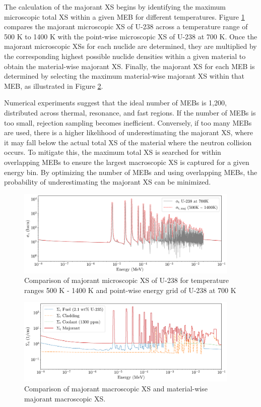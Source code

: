 The calculation of the majorant XS begins by identifying the maximum microscopic total XS within a given MEB for different temperatures. Figure \ref{fig_2} compares the majorant microscopic XS of U-238 across a temperature range of 500 K to 1400 K with the point-wise microscopic XS of U-238 at 700 K. Once the majorant microscopic XSs for each nuclide are determined, they are multiplied by the corresponding highest possible nuclide densities within a given material to obtain the material-wise majorant XS. Finally, the majorant XS for each MEB is determined by selecting the maximum material-wise majorant XS within that MEB, as illustrated in Figure \ref{fig_3}.

Numerical experiments suggest that the ideal number of MEBs is 1,200, distributed across thermal, resonance, and fast regions. If the number of MEBs is too small, rejection sampling becomes inefficient. Conversely, if too many MEBs are used, there is a higher likelihood of underestimating the majorant XS, where it may fall below the actual total XS of the material where the neutron collision occurs. To mitigate this, the maximum total XS is searched for within overlapping MEBs to ensure the largest macroscopic XS is captured for a given energy bin. By optimizing the number of MEBs and using overlapping MEBs, the probability of underestimating the majorant XS can be minimized.

\begin{figure}
    \centering
    \includegraphics[width=0.95\textwidth]{figs/maj.pdf}
    \caption[Comparison of majorant microscopic XS of U-238]{Comparison of majorant microscopic XS of U-238 for temperature ranges 500 K - 1400 K and point-wise energy grid of U-238 at 700 K}
    \label{fig_2}
\end{figure}
\begin{figure}
    \centering
    \includegraphics[width=0.95\textwidth]{figs/maj_mat.pdf}
    \caption[Comparison of majorant macroscopic XS]{Comparison of majorant macroscopic XS and material-wise majorant macroscopic XS.}
    \label{fig_3}
\end{figure}

